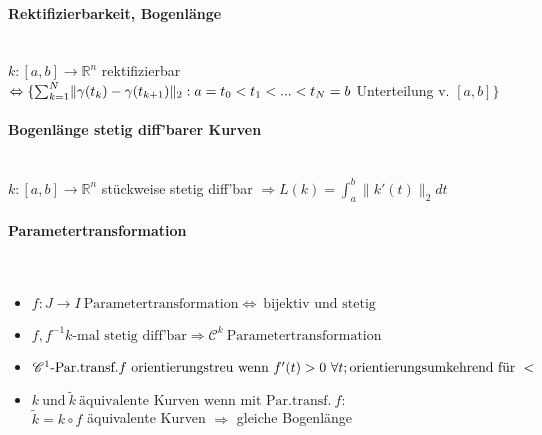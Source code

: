 \documentclass[paper=a3,paper=landscape, fontsize=9pt, DIV=30]{scrartcl}
\newcommand{\real}{{\mathbb{R}}}
\begin{document}
\begin{multicols*}{4}
  \paragraph{Rektifizierbarkeit, Bogenlänge}\hspace{0pt} \\
  $k:[a,b]\rightarrow \real^n$ rektifizierbar $\Leftrightarrow \{\sum_{k=1}^{N}\lVert\gamma(t_k)-\gamma(t_{k+1})\rVert_2:\\
  a = t_0 < t_1 < ... < t_N = b$ Unterteilung v. $[a,b]\}$


  \paragraph{Bogenlänge stetig diff'barer Kurven}\hspace{0pt} \\
  $k: [a,b]\rightarrow \real^n$ stückweise stetig diff'bar $\Rightarrow L(k)=\int_{a}^{b}\lVert k'(t)\rVert_2 dt$

  \paragraph{Parametertransformation}\hspace{0pt} \\
  \begin{itemize}
  	\item $f: J \rightarrow I \ \text{Parametertransformation} \Leftrightarrow \ \text{bijektiv und stetig}$
  	\item $f, f^{-1} k\text{-mal stetig diff'bar} \Rightarrow \mathscr{C}^k \ \text{Parametertransformation}$
  	\item $\mathscr{C}^1 \text{-Par.transf.} f \ \text{orientierungstreu wenn} \ f'(t) > 0 \ \forall t; \\ \text{orientierungsumkehrend für} \ <$
  	\item $ k \ \text{und}\ \tilde{k} \ \text{äquivalente Kurven wenn mit Par.transf.}\ f:$\\ $\tilde{k} = k \circ f$ äquivalente Kurven $\Rightarrow$ gleiche Bogenlänge
  \end{itemize}


\end{multicols*}
\end{document}

